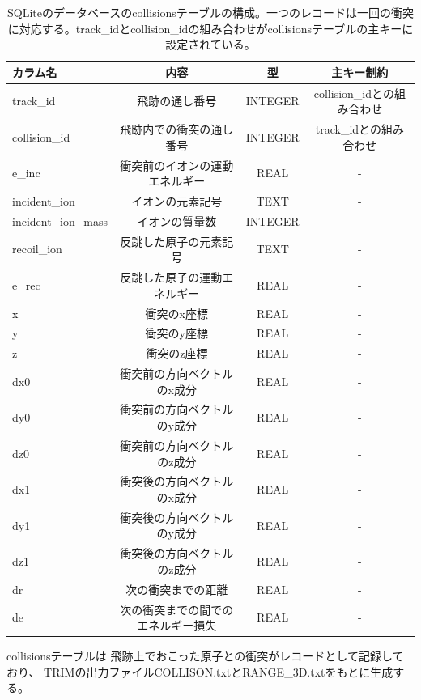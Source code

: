 \documentclass [11pt,a4paper,dvipdfmx] {jarticle}
\begin{document}
\begin{table}[htb]
    \begin{center}
        \caption{SQLiteのデータベースのcollisionsテーブルの構成。一つのレコードは一回の衝突に対応する。track\_idとcollision\_idの組み合わせがcollisionsテーブルの主キーに設定されている。}
        \label{tbcollisions}
        \begin{tabular}{lccc}
        \hline \hline
        カラム名 & 内容 & 型 & 主キー制約 \\ \hline
        track\_id & 飛跡の通し番号& INTEGER &  collision\_idとの組み合わせ\\
        collision\_id & 飛跡内での衝突の通し番号& INTEGER & track\_idとの組み合わせ \\
        e\_inc & 衝突前のイオンの運動エネルギー &  REAL &  - \\
        incident\_ion & イオンの元素記号 &  TEXT &  - \\
        incident\_ion\_mass & イオンの質量数 &  INTEGER &  - \\
        recoil\_ion & 反跳した原子の元素記号 &  TEXT &  - \\
        e\_rec & 反跳した原子の運動エネルギー &  REAL &  - \\
        x & 衝突のx座標　&  REAL &  - \\
        y & 衝突のy座標　&  REAL &  - \\
        z & 衝突のz座標　&  REAL &  - \\
        dx0 & 衝突前の方向ベクトルのx成分　&  REAL &  - \\
        dy0 & 衝突前の方向ベクトルのy成分　&  REAL &  - \\
        dz0 & 衝突前の方向ベクトルのz成分　&  REAL &  - \\
        dx1 & 衝突後の方向ベクトルのx成分　&  REAL &  - \\
        dy1 & 衝突後の方向ベクトルのy成分　&  REAL &  - \\
        dz1 & 衝突後の方向ベクトルのz成分　&  REAL &  - \\
        dr & 次の衝突までの距離　&  REAL &  - \\
        de & 次の衝突までの間でのエネルギー損失　&  REAL &  - \\ \hline \hline
    \end{tabular}
\end{center}
\end{table}

collisionsテーブルは
飛跡上でおこった原子との衝突がレコードとして記録しており、
TRIMの出力ファイルCOLLISON.txtとRANGE\_3D.txtをもとに生成する。
\end{document}

